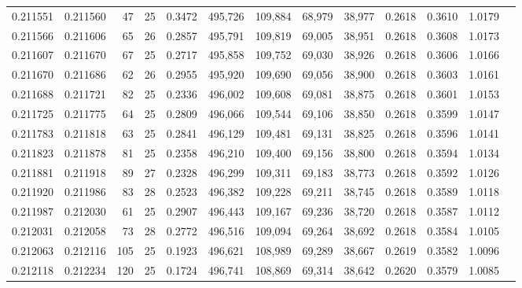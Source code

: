 \begin{tabular}{rrrrrrrrrrrrr}
0.211551 & 0.211560 &  47 &  25 &                                     0.3472 & 495,726 & 109,884 &  68,979 &  38,977 & 0.2618 & 0.3610 & 1.0179 \\
0.211566 & 0.211606 &  65 &  26 &                                     0.2857 & 495,791 & 109,819 &  69,005 &  38,951 & 0.2618 & 0.3608 & 1.0173 \\
0.211607 & 0.211670 &  67 &  25 &                                     0.2717 & 495,858 & 109,752 &  69,030 &  38,926 & 0.2618 & 0.3606 & 1.0166 \\
0.211670 & 0.211686 &  62 &  26 &                                     0.2955 & 495,920 & 109,690 &  69,056 &  38,900 & 0.2618 & 0.3603 & 1.0161 \\
0.211688 & 0.211721 &  82 &  25 &                                     0.2336 & 496,002 & 109,608 &  69,081 &  38,875 & 0.2618 & 0.3601 & 1.0153 \\
0.211725 & 0.211775 &  64 &  25 &                                     0.2809 & 496,066 & 109,544 &  69,106 &  38,850 & 0.2618 & 0.3599 & 1.0147 \\
0.211783 & 0.211818 &  63 &  25 &                                     0.2841 & 496,129 & 109,481 &  69,131 &  38,825 & 0.2618 & 0.3596 & 1.0141 \\
0.211823 & 0.211878 &  81 &  25 &                                     0.2358 & 496,210 & 109,400 &  69,156 &  38,800 & 0.2618 & 0.3594 & 1.0134 \\
0.211881 & 0.211918 &  89 &  27 &                                     0.2328 & 496,299 & 109,311 &  69,183 &  38,773 & 0.2618 & 0.3592 & 1.0126 \\
0.211920 & 0.211986 &  83 &  28 &                                     0.2523 & 496,382 & 109,228 &  69,211 &  38,745 & 0.2618 & 0.3589 & 1.0118 \\
0.211987 & 0.212030 &  61 &  25 &                                     0.2907 & 496,443 & 109,167 &  69,236 &  38,720 & 0.2618 & 0.3587 & 1.0112 \\
0.212031 & 0.212058 &  73 &  28 &                                     0.2772 & 496,516 & 109,094 &  69,264 &  38,692 & 0.2618 & 0.3584 & 1.0105 \\
0.212063 & 0.212116 & 105 &  25 &                                     0.1923 & 496,621 & 108,989 &  69,289 &  38,667 & 0.2619 & 0.3582 & 1.0096 \\
0.212118 & 0.212234 & 120 &  25 &                                     0.1724 & 496,741 & 108,869 &  69,314 &  38,642 & 0.2620 & 0.3579 & 1.0085 \\

\end{tabular}
